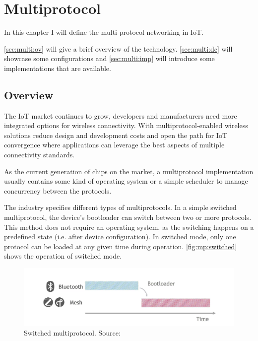 \section{Multiprotocol}
\label{chap:multiprot}
In this chapter I will define the multi-protocol networking in IoT.

\autoref{sec:multi:ov} will give a brief overview of the technology.
\autoref{sec:multi:dc} will showcase some configurations and \autoref{sec:multi:imp} will introduce some implementations that are available.

\subsection{Overview}
\label{sec:multi:ov}
The IoT market continues to grow, developers and manufacturers need more integrated options for wireless connectivity\cite{nxp_multiprot}. With multiprotocol-enabled wireless solutions reduce design and development costs and open the path for IoT convergence where applications can leverage the best aspects of multiple connectivity standards.

As the current generation of chips on the market, a multiprotocol implementation usually contains some kind of operating system or a simple scheduler to manage concurrency between the protocols.

The industry specifies different types of multiprotocols. In a simple switched multiprotocol, the device's bootloader can switch between two or more protocols. This method does not require an operating system, as the switching happens on a predefined state (i.e. after device configuration). In switched mode, only one protocol can be loaded at any given time during operation. \autoref{fig:mp:switched} shows the operation of switched mode.

\begin{figure}
    \centering
    \includegraphics[width=130mm, keepaspectratio]{figures/silabs-switched-multiprotocol.png}
    \caption{Switched multiprotocol. Source: \cite{silabs:mp}}
    \label{fig:mp:switched}
\end{figure}

